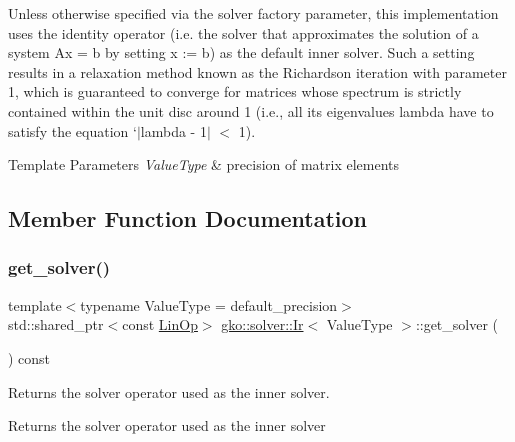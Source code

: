 Unless otherwise specified via the {\ttfamily solver} factory parameter, this implementation uses the identity operator (i.\+e. the solver that approximates the solution of a system Ax = b by setting x \+:= b) as the default inner solver. Such a setting results in a relaxation method known as the Richardson iteration with parameter 1, which is guaranteed to converge for matrices whose spectrum is strictly contained within the unit disc around 1 (i.\+e., all its eigenvalues {\ttfamily lambda} have to satisfy the equation `$\vert$lambda -\/ 1$\vert$ $<$ 1).


\begin{DoxyTemplParams}{Template Parameters}
{\em Value\+Type} & precision of matrix elements \\
\hline
\end{DoxyTemplParams}


\subsection{Member Function Documentation}
\mbox{\label{classgko_1_1solver_1_1Ir_a3996838d5c38740a9777b522317ce3f1}} 
\subsubsection{\texorpdfstring{get\+\_\+solver()}{get\_solver()}}
{\footnotesize\ttfamily template$<$typename Value\+Type  = default\+\_\+precision$>$ \\
std\+::shared\+\_\+ptr$<$const \hyperlink{classgko_1_1LinOp}{Lin\+Op}$>$ \hyperlink{classgko_1_1solver_1_1Ir}{gko\+::solver\+::\+Ir}$<$ Value\+Type $>$\+::get\+\_\+solver (\begin{DoxyParamCaption}{ }\end{DoxyParamCaption}) const}



Returns the solver operator used as the inner solver. 

\begin{DoxyReturn}{Returns}
the solver operator used as the inner solver 
\end{DoxyReturn}
\mbox{\label{classgko_1_1solver_1_1Ir_a2095b57bb8d3c31e0cfe395c911dbf84}} 
